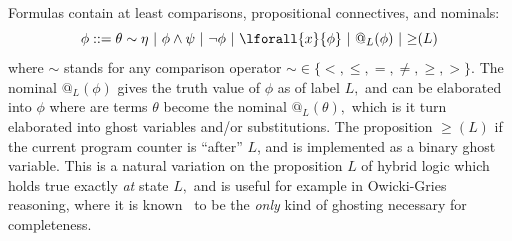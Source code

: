\documentclass[12pt]{cmuthesis}
\theoremstyle{definition}
\theoremstyle{remark}
\begin{document}
\newcommand{\eafter}[1]{{\geq}(#1)}
Formulas contain at least comparisons, propositional connectives, and nominals:
\[\phi ::=  \theta \sim \eta\ |\ \phi \land \psi\ |\ \neg \phi\ |\ \lforall{x}{\phi}\ |\ @_L(\phi)\ |\ \eafter{L}\]
where $\sim$ stands for any comparison operator $\sim \in \{<,\leq,=,\neq,\geq,>\}$.
The nominal $@_L(\phi)$ gives the truth value of $\phi$ as of label $L,$ and can be elaborated into $\phi$ where are terms $\theta$ become the nominal $@_L(\theta),$ which is it turn elaborated into ghost variables and/or substitutions.
The proposition $\eafter{L}$ if the current program counter is ``after'' $L$, and is implemented as a binary ghost variable.
This is a natural variation on the proposition $L$ of hybrid logic which holds true exactly \emph{at} state $L,$ and is useful for example in Owicki-Gries~\cite{Owicki1976} reasoning, where it is known~\cite{DBLP:journals/tse/Lamport77} to be the \emph{only} kind of ghosting necessary for completeness.
\end{document}
